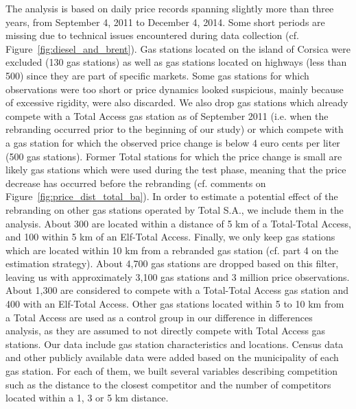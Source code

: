 \documentclass[english]{article}
\begin{document}
The analysis is based on daily price records spanning slightly more than three years, from September 4, 2011 to December 4, 2014. Some short periods are missing due to technical issues encountered during data collection (cf. Figure~\ref{fig:diesel_and_brent}). Gas stations located on the island of Corsica were excluded (130 gas stations) as well as gas stations located on highways (less than 500) since they are part of specific markets. Some gas stations for which observations were too short or price dynamics looked suspicious, mainly because of excessive rigidity, were also discarded. We also drop gas stations which already compete with a Total Access gas station as of September 2011 (i.e. when the rebranding occurred prior to the beginning of our study) or which compete with a gas station for which the observed price change is below 4 euro cents per liter (500 gas stations). Former Total stations for which the price change is small are likely gas stations which were used during the test phase, meaning that the price decrease has occurred before the rebranding (cf. comments on Figure~\ref{fig:price_dist_total_ba}). In order to estimate a potential effect of the rebranding on other gas stations operated by Total S.A., we include them in the analysis. About 300 are located within a distance of 5 km of a Total-Total Access, and 100 within 5 km of an Elf-Total Access. Finally, we only keep gas stations which are located within 10 km from a rebranded gas station (cf. part 4 on the estimation strategy). About 4,700 gas stations are dropped based on this filter, leaving us with approximately 3,100 gas stations and 3 million price observations. About 1,300 are considered to compete with a Total-Total Access gas station and 400 with an Elf-Total Access. Other gas stations located within 5 to 10 km from a Total Access are used as a control group in our difference in differences analysis, as they are assumed to not directly compete with Total Access gas stations. Our data include gas station characteristics and locations. Census data and other publicly available data were added based on the municipality of each gas station. For each of them, we built several variables describing competition such as the distance to the closest competitor and the number of competitors located within a 1, 3 or 5 km distance.
\end{document}
